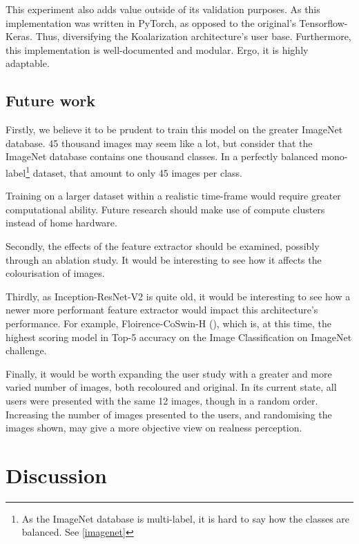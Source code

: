 \documentclass{article}
\begin{document}
    This experiment also adds value outside of its validation purposes. As this implementation was written in PyTorch, as opposed to the original's Tensorflow-Keras. Thus, diversifying the Koalarization architecture's user base. Furthermore, this implementation is well-documented and modular. Ergo, it is highly adaptable.
    
    \subsection{Future work} \label{future}
        Firstly, we believe it to be prudent to train this model on the greater ImageNet database. 45 thousand images may seem like a lot, but consider that the ImageNet database contains one thousand classes. In a perfectly balanced mono-label\footnote{As the ImageNet database is multi-label, it is hard to say how the classes are balanced. See \ref{imagenet}} dataset, that amount to only 45 images per class. 
        
        Training on a larger dataset within a realistic time-frame would require greater computational ability. Future research should make use of compute clusters instead of home hardware.
        
        Secondly, the effects of the feature extractor should be examined, possibly through an ablation study. It would be interesting to see how it affects the colourisation of images.
        
        Thirdly, as Inception-ResNet-V2 is quite old, it would be interesting to see how a newer more performant feature extractor would impact this architecture's performance. For example, Floirence-CoSwin-H (\cite{florence}), which is, at this time, the highest scoring model in Top-5 accuracy on the Image Classification on ImageNet challenge.
        
        Finally, it would be worth expanding the user study with a greater and more varied number of images, both recoloured and original. In its current state, all users were presented with the same 12 images, though in a random order. Increasing the number of images presented to the users, and randomising the images shown, may give a more objective view on realness perception.

\section{Discussion} \label{disc}
\end{document}
